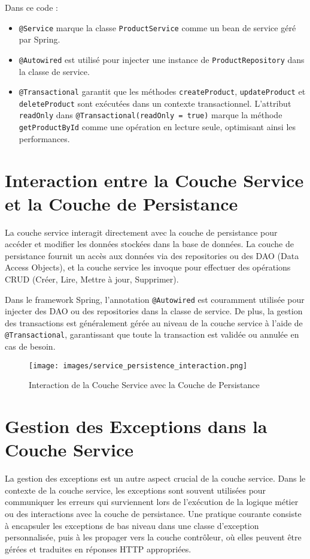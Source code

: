 \documentclass{article}
\begin{document}
Dans ce code :

\begin{itemize}
    \item \texttt{@Service} marque la classe \texttt{ProductService} comme un bean de service géré par Spring.
    \item \texttt{@Autowired} est utilisé pour injecter une instance de \texttt{ProductRepository} dans la classe de service.
    \item \texttt{@Transactional} garantit que les méthodes \texttt{createProduct}, \texttt{updateProduct} et \texttt{deleteProduct} sont exécutées dans un contexte transactionnel. L'attribut \texttt{readOnly} dans \texttt{@Transactional(readOnly = true)} marque la méthode \texttt{getProductById} comme une opération en lecture seule, optimisant ainsi les performances.
\end{itemize}

\section{Interaction entre la Couche Service et la Couche de Persistance}
La couche service interagit directement avec la couche de persistance pour accéder et modifier les données stockées dans la base de données. La couche de persistance fournit un accès aux données via des repositories ou des DAO (Data Access Objects), et la couche service les invoque pour effectuer des opérations CRUD (Créer, Lire, Mettre à jour, Supprimer).

Dans le framework Spring, l'annotation \texttt{@Autowired} est couramment utilisée pour injecter des DAO ou des repositories dans la classe de service. De plus, la gestion des transactions est généralement gérée au niveau de la couche service à l'aide de \texttt{@Transactional}, garantissant que toute la transaction est validée ou annulée en cas de besoin.

\begin{figure}[H]
    \centering
    \begin{framed}
        \texttt{[image: images/service\_persistence\_interaction.png]}
    \end{framed}
    \caption{Interaction de la Couche Service avec la Couche de Persistance}
    \label{fig:service-persistence}
\end{figure}

\section{Gestion des Exceptions dans la Couche Service}
La gestion des exceptions est un autre aspect crucial de la couche service. Dans le contexte de la couche service, les exceptions sont souvent utilisées pour communiquer les erreurs qui surviennent lors de l'exécution de la logique métier ou des interactions avec la couche de persistance. Une pratique courante consiste à encapsuler les exceptions de bas niveau dans une classe d'exception personnalisée, puis à les propager vers la couche contrôleur, où elles peuvent être gérées et traduites en réponses HTTP appropriées.
\end{document}
